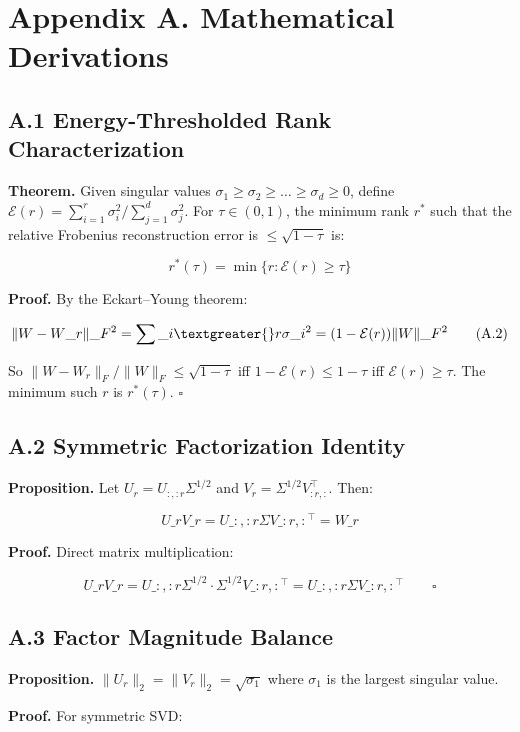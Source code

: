 
\section{Appendix A. Mathematical Derivations}

\subsection{A.1 Energy-Thresholded Rank Characterization}

\textbf{Theorem.} Given singular values $\sigma_1 \geq \sigma_2 \geq \dots \geq \sigma_d \geq 0$, 
define $\mathcal{E}(r) = \sum_{i=1}^r \sigma_i^2 / \sum_{j=1}^d \sigma_j^2$. For 
$\tau \in (0, 1)$, the minimum rank $r^*$ such that the relative Frobenius 
reconstruction error is $\leq \sqrt{1 - \tau}$ is:

\[
r^*(\tau) = \min\{r : \mathcal{E}(r) \geq \tau\}
\tag{A.1}
\]

\textbf{Proof.} By the Eckart--Young theorem:

\[
\|W - W\_r\|\_F^2 = \sum\_{i \textgreater{} r} \sigma\_i^2 = (1 - \mathcal{E}(r)) \|W\|\_F^2
\tag{A.2}
\]

So $\|W - W_r\|_F / \|W\|_F \leq \sqrt{1 - \tau}$ iff $1 - \mathcal{E}(r) \leq 1 - \tau$ 
iff $\mathcal{E}(r) \geq \tau$. The minimum such $r$ is $r^*(\tau)$. $\square$

\subsection{A.2 Symmetric Factorization Identity}

\textbf{Proposition.} Let $U_r = U_{:, :r} \Sigma^{1/2}$ and $V_r = \Sigma^{1/2} V_{:r, :}^\top$. 
Then:

\[
U\_r V\_r = U\_{:, :r} \Sigma V\_{:r, :}^\top = W\_r
\tag{A.3}
\]

\textbf{Proof.} Direct matrix multiplication:

\[
U\_r V\_r = U\_{:, :r} \Sigma^{1/2} \cdot \Sigma^{1/2} V\_{:r, :}^\top = U\_{:, :r} \Sigma V\_{:r, :}^\top \qquad \square
\]

\subsection{A.3 Factor Magnitude Balance}

\textbf{Proposition.} $\|U_r\|_2 = \|V_r\|_2 = \sqrt{\sigma_1}$ where $\sigma_1$ is 
the largest singular value.

\textbf{Proof.} For symmetric SVD:

